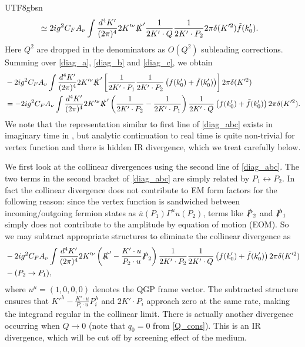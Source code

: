 \documentclass[11pt]{article}\def\baselinestretch{1.4}
\def\G{{\Gamma}}
\def\m{{\mu}}
\def\({\left(}
\def\){\right)}
\begin{document}
\begin{CJK}{UTF8}{gbsn}
\begin{align}
   &\simeq 2ig^2C_F A_\nu \int\frac{d^{4} K'}{( 2\pi )^{4}} 2K'^\nu \slashed{K}' \frac{1}{2K'\cdot Q}\frac{1}{2K'\cdot P_2}2\pi \delta (K'^2)\tilde{f}(k'_0).
\end{align}
Here $Q^2$ are dropped in the denominators as $O(Q^2)$ subleading corrections.
Summing over \eqref{diag_a}, \eqref{diag_b} and \eqref{diag_c}, we obtain
\begin{align}\label{diag_abc}
   &-2ig^2C_F A_\nu \int\frac{d^{4} K'}{( 2\pi )^{4}} 2K'^\nu \slashed{K}' \left[ \frac{1}{2K'\cdot P_1}\frac{1}{2K'\cdot P_2}\(f(k'_0)+\tilde{f}(k'_0)\) \right]2\pi \delta (K'^2) \nonumber\\
   &=-2ig^2C_F A_\nu \int\frac{d^{4} K'}{( 2\pi )^{4}} 2K'^\nu \slashed{K}'\left(\frac{1}{2K'\cdot P_2}-\frac{1}{2K'\cdot P_1}\right)\frac{1}{2K'\cdot Q}\left(f(k'_0)+\tilde{f}(k'_0)\right)2\pi \delta (K'^2). %
\end{align}
We note that the representation similar to first line of \eqref{diag_abc} exists in imaginary time in \cite{le2000thermal}, but analytic continuation to real time is quite non-trivial for vertex function and there is hidden IR divergence, which we treat carefully below.

We first look at the collinear divergences using the second line of \eqref{diag_abc}. The two terms in the second bracket of \eqref{diag_abc} are simply related by $P_1\leftrightarrow P_2$. In fact the collinear divergence does not contribute to EM form factors for the following reason: since the vertex function is sandwiched between incoming/outgoing %
fermion states as $\bar{u}(P_1)\G^\m u(P_2)$, terms like $\slashed{P}_2$ and $\slashed{P}_1$ simply does not contribute to the amplitude by equation of motion (EOM). So we may subtract appropriate structures to eliminate the collinear divergence as
\begin{align}
&-2ig^2C_F A_\nu \int\frac{d^{4} K'}{( 2\pi )^{4}} 2 K'^\nu \left(\slashed{K}' -\frac{K' \cdot u}{P_2 \cdot u}\slashed{P}_2 \right) 
\frac{1}{2K'\cdot P_2}\frac{1}{2K'\cdot Q}\left(f(k'_0)+\tilde{f}(k'_0)\right)2\pi \delta (K'^2)\nonumber\\
&-(P_2\to P_1) ,\label{integral_with_counterterm}
\end{align}
where $u^\mu =(1, 0, 0, 0)$ denotes the QGP frame vector. The subtracted structure ensures that $K'^\lambda -\frac{K' \cdot u}{P_{i} \cdot u}P_{i}^\lambda$ and $2K'\cdot P_{i}$ approach zero at the same rate, making the integrand regular in the collinear limit. There is actually another divergence occurring when $Q\to0$ (note that $q_0=0$ from \eqref{Q_cons}). This is an IR divergence, which will be cut off by screening effect of the medium.


\end{CJK}
\end{document}
